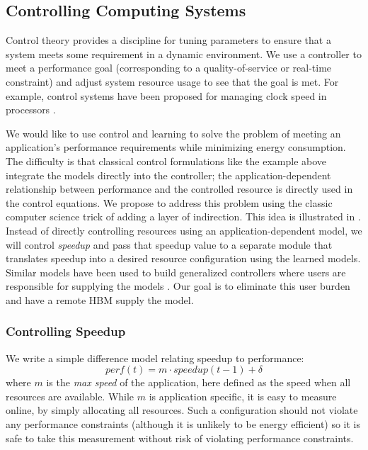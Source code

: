 \subsection{Controlling Computing Systems}

Control theory provides a discipline for tuning parameters to ensure
that a system meets some requirement in a dynamic environment.  
We use a controller to meet a performance goal (corresponding to a
quality-of-service or real-time constraint) and adjust system resource
usage to see that the goal is met.  For example, control systems have
been proposed for managing clock speed in processors \cite{lefurgy}.


We would like to use control and learning to solve the problem of
meeting an application's performance requirements while minimizing
energy consumption.  The difficulty is that classical control
formulations like the example above integrate the models directly into
the controller; \ie the application-dependent relationship between
performance and the controlled resource is directly used in the
control equations.  We propose to address this problem using the
classic computer science trick of adding a layer of indirection.  This
idea is illustrated in .  Instead of directly
controlling resources using an application-dependent model, we will
control \emph{speedup} and pass that speedup value to a separate
module that translates speedup into a desired resource configuration
using the learned models.  Similar models have been used to build
generalized controllers where users are responsible for supplying the
models \cite{POET}.  Our goal is to eliminate this user burden and
have a remote HBM supply the model.

\subsubsection{Controlling Speedup}
We write a simple difference model relating speedup to performance:
\begin{equation}
  perf(t) = m \cdot speedup(t-1) + \delta \label{eqn:speedup}
\end{equation}
where $m$ is the \emph{max speed} of the application, here defined as
the speed when all resources are available.  While $m$ is application
specific, it is easy to measure online, by simply allocating all
resources. Such a configuration should not violate any performance
constraints (although it is unlikely to be energy efficient) so it is
safe to take this measurement without risk of violating performance
constraints.


